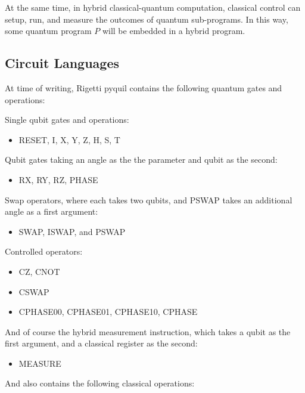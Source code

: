 \documentclass[a4paper,twocolumn,11pt,accepted=2017-05-09]{quantumarticle}
\begin{document}
At the same time, in hybrid classical-quantum computation, classical control can setup, run, and measure the outcomes of quantum sub-programs.
In this way, some quantum program $P$ will be embedded in a hybrid program.

\subsection{Circuit Languages}

At time of writing, Rigetti pyquil contains the following quantum gates and operations:

Single qubit gates and operations:

\begin{itemize}
    \item RESET, I, X, Y, Z, H, S, T
\end{itemize}

Qubit gates taking an angle as the the parameter and qubit as the second:

\begin{itemize}
    \item RX, RY, RZ, PHASE
\end{itemize}

Swap operators, where each takes two qubits, and PSWAP takes an additional angle as a first argument:

\begin{itemize}
    \item SWAP, ISWAP, and PSWAP
\end{itemize}

Controlled operators:

\begin{itemize}
    \item CZ, CNOT %
    \item CSWAP %
    \item CPHASE00, CPHASE01, CPHASE10, CPHASE %
\end{itemize}

And of course the hybrid measurement instruction, which takes a qubit as the first argument, and a classical register as the second:

\begin{itemize}
    \item MEASURE
\end{itemize}

And also contains the following classical operations:
\end{document}
